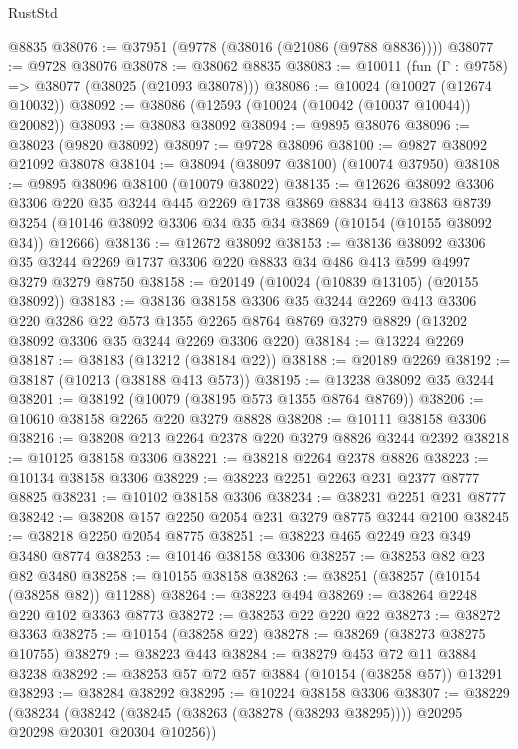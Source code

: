 \begin{lexlean}{RustStd}
\begin{coremodule}
{\begin{coremodule}
{{{{{{{{{{{{{{{{{{{{{{{{{{    @8835
@38076 := @37951 (@9778 (@38016 (@21086 (@9788 @8836))))
@38077 := @9728 @38076
@38078 := @38062 @8835
@38083 := @10011 (fun (Γ : @9758) => @38077 (@38025 (@21093 @38078)))
@38086 := @10024 (@10027 (@12674 @10032))
@38092 := @38086 (@12593 (@10024 (@10042 (@10037 @10044)) @20082))
@38093 := @38083 @38092
@38094 := @9895 @38076
@38096 := @38023 (@9820 @38092)
@38097 := @9728 @38096
@38100 := @9827 @38092 @21092 @38078
@38104 := @38094 (@38097 @38100) (@10074 @37950)
@38108 := @9895 @38096 @38100 (@10079 @38022)
@38135 := @12626
    @38092
    @3306
    @3306
    @220
    @35
    @3244
    @445
    @2269
    @1738
    @3869
    @8834
    @413
    @3863
    @8739
    @3254
    (@10146 @38092 @3306 @34 @35 @34 @3869 (@10154 (@10155 @38092 @34)) @12666)
@38136 := @12672 @38092
@38153 := @38136
    @38092
    @3306
    @35
    @3244
    @2269
    @1737
    @3306
    @220
    @8833
    @34
    @486
    @413
    @599
    @4997
    @3279
    @3279
    @8750
@38158 := @20149 (@10024 (@10839 @13105) (@20155 @38092))
@38183 := @38136
    @38158
    @3306
    @35
    @3244
    @2269
    @413
    @3306
    @220
    @3286
    @22
    @573
    @1355
    @2265
    @8764
    @8769
    @3279
    @8829
    (@13202 @38092 @3306 @35 @3244 @2269 @3306 @220)
@38184 := @13224 @2269
@38187 := @38183 (@13212 (@38184 @22))
@38188 := @20189 @2269
@38192 := @38187 (@10213 (@38188 @413 @573))
@38195 := @13238 @38092 @35 @3244
@38201 := @38192 (@10079 (@38195 @573 @1355 @8764 @8769))
@38206 := @10610 @38158 @2265 @220 @3279 @8828
@38208 := @10111 @38158 @3306
@38216 := @38208 @213 @2264 @2378 @220 @3279 @8826 @3244 @2392
@38218 := @10125 @38158 @3306
@38221 := @38218 @2264 @2378 @8826
@38223 := @10134 @38158 @3306
@38229 := @38223 @2251 @2263 @231 @2377 @8777 @8825
@38231 := @10102 @38158 @3306
@38234 := @38231 @2251 @231 @8777
@38242 := @38208 @157 @2250 @2054 @231 @3279 @8775 @3244 @2100
@38245 := @38218 @2250 @2054 @8775
@38251 := @38223 @465 @2249 @23 @349 @3480 @8774
@38253 := @10146 @38158 @3306
@38257 := @38253 @82 @23 @82 @3480
@38258 := @10155 @38158
@38263 := @38251 (@38257 (@10154 (@38258 @82)) @11288)
@38264 := @38223 @494
@38269 := @38264 @2248 @220 @102 @3363 @8773
@38272 := @38253 @22 @220 @22
@38273 := @38272 @3363
@38275 := @10154 (@38258 @22)
@38278 := @38269 (@38273 @38275 @10755)
@38279 := @38223 @443
@38284 := @38279 @453 @72 @11 @3884 @3238
@38292 := @38253 @57 @72 @57 @3884 (@10154 (@38258 @57)) @13291
@38293 := @38284 @38292
@38295 := @10224 @38158 @3306
@38307 := @38229
    (@38234 (@38242 (@38245 (@38263 (@38278 (@38293 @38295)))) @20295 @20298 @20301 @20304 @10256))
}}}}}}}}}}}}}}}}}}}}}}}}}}
\end{coremodule}}
\end{coremodule}
\end{lexlean}
